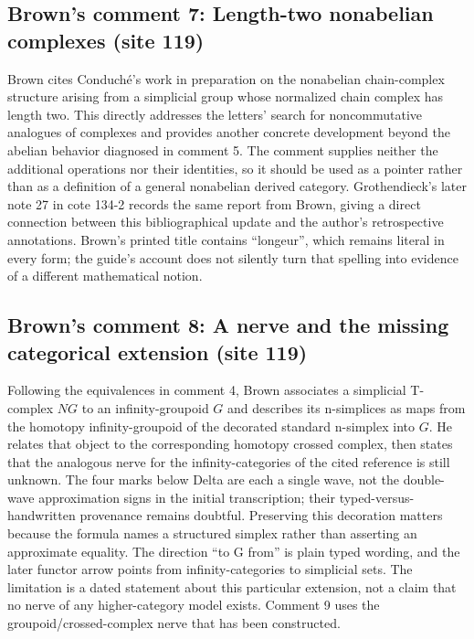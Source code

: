 \subsection*{Brown's comment 7: Length-two nonabelian complexes (site 119)}
Brown cites Conduché's work in preparation on the nonabelian chain-complex structure arising from a simplicial group whose normalized chain complex has length two. This directly addresses the letters' search for noncommutative analogues of complexes and provides another concrete development beyond the abelian behavior diagnosed in comment 5. The comment supplies neither the additional operations nor their identities, so it should be used as a pointer rather than as a definition of a general nonabelian derived category. Grothendieck's later note 27 in cote 134-2 records the same report from Brown, giving a direct connection between this bibliographical update and the author's retrospective annotations. Brown's printed title contains ``longeur'', which remains literal in every form; the guide's account does not silently turn that spelling into evidence of a different mathematical notion.

\subsection*{Brown's comment 8: A nerve and the missing categorical extension (site 119)}
Following the equivalences in comment 4, Brown associates a simplicial T-complex $NG$ to an infinity-groupoid $G$ and describes its n-simplices as maps from the homotopy infinity-groupoid of the decorated standard n-simplex into $G$. He relates that object to the corresponding homotopy crossed complex, then states that the analogous nerve for the infinity-categories of the cited reference is still unknown. The four marks below Delta are each a single wave, not the double-wave approximation signs in the initial transcription; their typed-versus-handwritten provenance remains doubtful. Preserving this decoration matters because the formula names a structured simplex rather than asserting an approximate equality. The direction ``to G from'' is plain typed wording, and the later functor arrow points from infinity-categories to simplicial sets. The limitation is a dated statement about this particular extension, not a claim that no nerve of any higher-category model exists. Comment 9 uses the groupoid/crossed-complex nerve that has been constructed.

